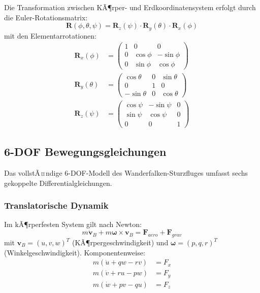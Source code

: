 ﻿\documentclass[12pt,a4paper]{article}
\theoremstyle{remark}
\begin{document}
	Die Transformation zwischen KÃ¶rper- und Erdkoordinatensystem erfolgt durch die Euler-Rotationsmatrix:
	\begin{equation}
		\mathbf{R}(\phi, \theta, \psi) = \mathbf{R}_z(\psi) \cdot \mathbf{R}_y(\theta) \cdot \mathbf{R}_x(\phi)
		\label{eq:rotation}
	\end{equation}
	mit den Elementarrotationen:
	\begin{align}
		\mathbf{R}_x(\phi) &= \begin{pmatrix} 1 & 0 & 0 \\ 0 & \cos\phi & -\sin\phi \\ 0 & \sin\phi & \cos\phi \end{pmatrix} \\
		\mathbf{R}_y(\theta) &= \begin{pmatrix} \cos\theta & 0 & \sin\theta \\ 0 & 1 & 0 \\ -\sin\theta & 0 & \cos\theta \end{pmatrix} \\
		\mathbf{R}_z(\psi) &= \begin{pmatrix} \cos\psi & -\sin\psi & 0 \\ \sin\psi & \cos\psi & 0 \\ 0 & 0 & 1 \end{pmatrix}
	\end{align}
	
	\subsection{6-DOF Bewegungsgleichungen}
	
	Das vollstÃ¤ndige 6-DOF-Modell des Wanderfalken-Sturzfluges umfasst sechs gekoppelte Differentialgleichungen.
	
	\subsubsection{Translatorische Dynamik}
	
	Im kÃ¶rperfesten System gilt nach Newton:
	\begin{equation}
		m \dot{\mathbf{v}}_B + m \boldsymbol{\omega} \times \mathbf{v}_B = \mathbf{F}_{aero} + \mathbf{F}_{grav}
		\label{eq:newton_trans}
	\end{equation}
	mit $\mathbf{v}_B = (u, v, w)^T$ (KÃ¶rpergeschwindigkeit) und $\boldsymbol{\omega} = (p, q, r)^T$ (Winkelgeschwindigkeit). Komponentenweise:
	\begin{align}
		m(\dot{u} + qw - rv) &= F_{x} \\
		m(\dot{v} + ru - pw) &= F_{y} \\
		m(\dot{w} + pv - qu) &= F_{z}
	\end{align}
	
\end{document}
